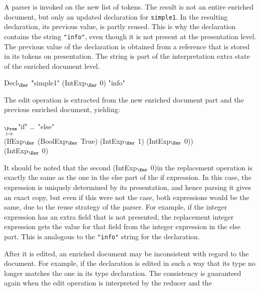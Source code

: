 A parser is invoked on the new list of tokens. The result is not an entire enriched document, but only an updated declaration for \verb|simple1|. In the resulting declaration, its previous value, is partly reused. This is why the declaration contains the string \verb|"info"|, even though it is not present at the presentation level. The previous value of the declaration is obtained from a reference that is stored in its tokens on presentation. The string is part of the interpretation extra state of the enriched document level.

\small \ttfamily
\begin{tabbing}
Decl$_{\Enr}$ \= "simple1" (IntExp$_{\Enr}$ 0) "info"
\end{tabbing}
\rmfamily \normalsize

The edit operation is extracted from the new enriched document part and the previous enriched document, yielding:

\small \ttfamily
\begin{tabbing}
$_{\Pres}$\ttfamily  "if" \dots~"else"\\
$\mapsto$\\
  \ttfamily (IfExp$_{\Enr}$ (BoolExp$_{\Enr}$ True) (IntExp$_{\Enr}$ 1) (IntExp$_{\Enr}$ 0))\\
  \ttfamily (IntExp$_{\Enr}$ 0) 
\end{tabbing}
\rmfamily \normalsize

It should be noted that the second \ttfamily (IntExp$_{\Enr}$ 0)\rmfamily in the replacement operation is exactly the same as the one in the else part of the if expression. In this case, the expression is uniquely determined by its presentation, and hence parsing it gives an exact copy, but even if this were not the case, both expressions would be the same, due to the reuse strategy of the parser. For example, if the integer expression has an extra field that is not presented, the replacement integer expression gets the value for that field from the integer expression in the else part. This is analogous to the \verb|"info"| string for the declaration.


\bc
After it is edited, an enriched document may be inconsistent with regard to the document. For example, if the declaration is edited in such a way that its type no longer matches the one in its type declaration. The consistency is guaranteed again when the edit operation is interpreted by the reducer and the 
\ec

